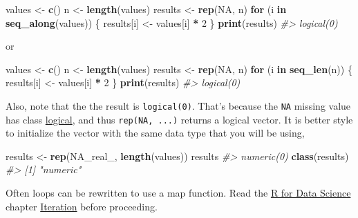 \documentclass[]{book}
\newenvironment{Shaded}{\begin{snugshade}}{\end{snugshade}}
\newcommand{\CommentTok}[1]{\textcolor[rgb]{0.56,0.35,0.01}{\textit{#1}}}
\newcommand{\ControlFlowTok}[1]{\textcolor[rgb]{0.13,0.29,0.53}{\textbf{#1}}}
\newcommand{\DecValTok}[1]{\textcolor[rgb]{0.00,0.00,0.81}{#1}}
\newcommand{\KeywordTok}[1]{\textcolor[rgb]{0.13,0.29,0.53}{\textbf{#1}}}
\newcommand{\NormalTok}[1]{#1}
\newcommand{\OperatorTok}[1]{\textcolor[rgb]{0.81,0.36,0.00}{\textbf{#1}}}
\newcommand{\OtherTok}[1]{\textcolor[rgb]{0.56,0.35,0.01}{#1}}
\newcommand{\StringTok}[1]{\textcolor[rgb]{0.31,0.60,0.02}{#1}}
\theoremstyle{definition}
\theoremstyle{definition}
\theoremstyle{definition}
\theoremstyle{remark}
\begin{document}
\begin{Shaded}
\begin{Highlighting}[]
\NormalTok{values <-}\StringTok{ }\KeywordTok{c}\NormalTok{()}
\NormalTok{n <-}\StringTok{ }\KeywordTok{length}\NormalTok{(values)}
\NormalTok{results <-}\StringTok{ }\KeywordTok{rep}\NormalTok{(}\OtherTok{NA}\NormalTok{, n)}
\ControlFlowTok{for}\NormalTok{ (i }\ControlFlowTok{in} \KeywordTok{seq_along}\NormalTok{(values)) \{}
\NormalTok{  results[i] <-}\StringTok{ }\NormalTok{values[i] }\OperatorTok{*}\StringTok{ }\DecValTok{2}
\NormalTok{\}}
\KeywordTok{print}\NormalTok{(results)}
\CommentTok{#> logical(0)}
\end{Highlighting}
\end{Shaded}

or

\begin{Shaded}
\begin{Highlighting}[]
\NormalTok{values <-}\StringTok{ }\KeywordTok{c}\NormalTok{()}
\NormalTok{n <-}\StringTok{ }\KeywordTok{length}\NormalTok{(values)}
\NormalTok{results <-}\StringTok{ }\KeywordTok{rep}\NormalTok{(}\OtherTok{NA}\NormalTok{, n)}
\ControlFlowTok{for}\NormalTok{ (i }\ControlFlowTok{in} \KeywordTok{seq_len}\NormalTok{(n)) \{}
\NormalTok{  results[i] <-}\StringTok{ }\NormalTok{values[i] }\OperatorTok{*}\StringTok{ }\DecValTok{2}
\NormalTok{\}}
\KeywordTok{print}\NormalTok{(results)}
\CommentTok{#> logical(0)}
\end{Highlighting}
\end{Shaded}

Also, note that the the result is \texttt{logical(0)}. That's because
the \texttt{NA} missing value has class
\href{http://r4ds.had.co.nz/vectors.html\#missing-values-4}{logical},
and thus \texttt{rep(NA,\ ...)} returns a logical vector. It is better
style to initialize the vector with the same data type that you will be
using,

\begin{Shaded}
\begin{Highlighting}[]
\NormalTok{results <-}\StringTok{ }\KeywordTok{rep}\NormalTok{(}\OtherTok{NA_real_}\NormalTok{, }\KeywordTok{length}\NormalTok{(values))}
\NormalTok{results}
\CommentTok{#> numeric(0)}
\KeywordTok{class}\NormalTok{(results)}
\CommentTok{#> [1] "numeric"}
\end{Highlighting}
\end{Shaded}

Often loops can be rewritten to use a map function. Read the
\href{http://r4ds.had.co.nz/}{R for Data Science} chapter
\href{http://r4ds.had.co.nz/data-visualisation.html}{Iteration} before
proceeding.
\end{document}
